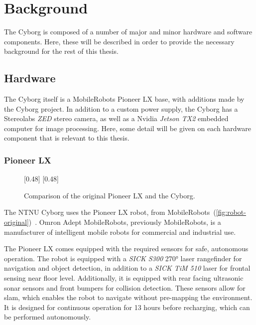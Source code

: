 \documentclass[\rootfolder/main.tex]{subfiles}
\begin{document}
\chapter{Background}
\label{ch:background}

The Cyborg is composed of a number of major and minor hardware and software components.
Here, these will be described in order to provide the necessary background for the rest of this thesis.


\section{Hardware}

The Cyborg itself is a MobileRobots Pioneer LX base, with additions made by the Cyborg project.
In addition to a custom power supply, the Cyborg has a Stereolabs \emph{ZED} stereo camera, as well as a Nvidia \emph{Jetson TX2} embedded computer for image processing.
Here, some detail will be given on each hardware component that is relevant to this thesis.


\subsection{Pioneer LX}

\begin{figure}[h]
    \centering
    [0.48\columnwidth]{}%
    [0.48\columnwidth]{}
    \caption{Comparison of the original Pioneer LX and the Cyborg.}
    \label{fig:robot-comparison}
\end{figure}

The NTNU Cyborg uses the Pioneer LX robot, from MobileRobots~(\cref{fig:robot-original})~\cite{MobileRobots}.
Omron Adept MobileRobots, previously MobileRobots, is a manufacturer of intelligent mobile robots for commercial and industrial use.

The Pioneer LX comes equipped with the required sensors for safe, autonomous operation.
The robot is equipped with a \emph{SICK S300} \ang{270} laser rangefinder for navigation and object detection, in addition to a \emph{SICK TiM 510} laser for frontal sensing near floor level.
Additionally, it is equipped with rear facing ultrasonic sonar sensors and front bumpers for collision detection.
These sensors allow for \acrfull{slam}, which enables the robot to navigate without pre-mapping the environment.
It is designed for continuous operation for 13 hours before recharging, which can be performed autonomously.
\end{document}
